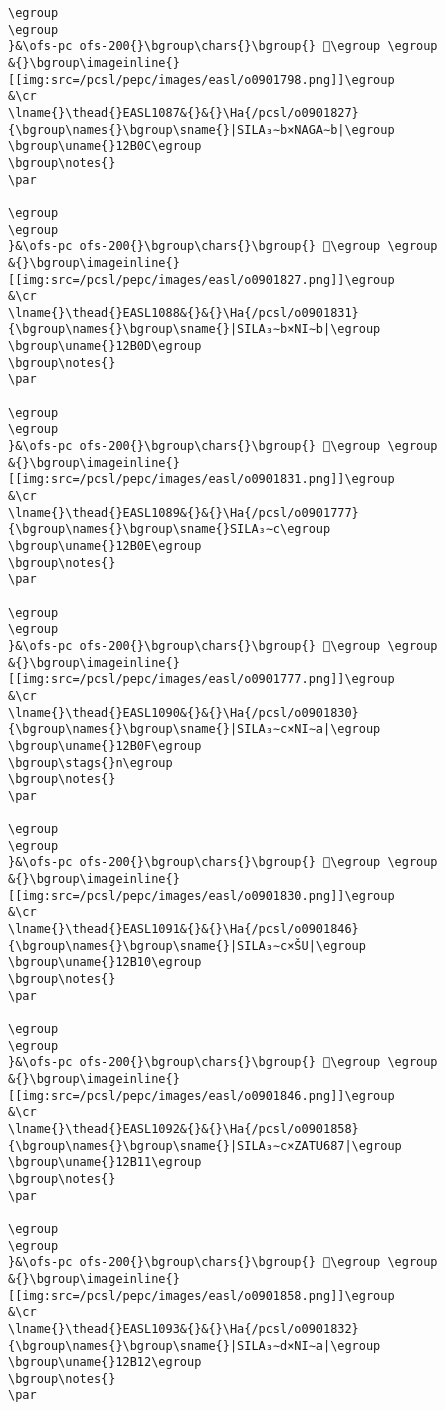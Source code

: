 \begin{verbatim}
\egroup
\egroup
}&\ofs-pc ofs-200{}\bgroup\chars{}\bgroup{} 𒬋\egroup \egroup
&{}\bgroup\imageinline{}[[img:src=/pcsl/pepc/images/easl/o0901798.png]]\egroup
&\cr
\lname{}\thead{}EASL1087&{}&{}\Ha{/pcsl/o0901827}{\bgroup\names{}\bgroup\sname{}|SILA₃∼b×NAGA∼b|\egroup
\bgroup\uname{}12B0C\egroup
\bgroup\notes{}
\par 

\egroup
\egroup
}&\ofs-pc ofs-200{}\bgroup\chars{}\bgroup{} 𒬌\egroup \egroup
&{}\bgroup\imageinline{}[[img:src=/pcsl/pepc/images/easl/o0901827.png]]\egroup
&\cr
\lname{}\thead{}EASL1088&{}&{}\Ha{/pcsl/o0901831}{\bgroup\names{}\bgroup\sname{}|SILA₃∼b×NI∼b|\egroup
\bgroup\uname{}12B0D\egroup
\bgroup\notes{}
\par 

\egroup
\egroup
}&\ofs-pc ofs-200{}\bgroup\chars{}\bgroup{} 𒬍\egroup \egroup
&{}\bgroup\imageinline{}[[img:src=/pcsl/pepc/images/easl/o0901831.png]]\egroup
&\cr
\lname{}\thead{}EASL1089&{}&{}\Ha{/pcsl/o0901777}{\bgroup\names{}\bgroup\sname{}SILA₃∼c\egroup
\bgroup\uname{}12B0E\egroup
\bgroup\notes{}
\par 

\egroup
\egroup
}&\ofs-pc ofs-200{}\bgroup\chars{}\bgroup{} 𒬎\egroup \egroup
&{}\bgroup\imageinline{}[[img:src=/pcsl/pepc/images/easl/o0901777.png]]\egroup
&\cr
\lname{}\thead{}EASL1090&{}&{}\Ha{/pcsl/o0901830}{\bgroup\names{}\bgroup\sname{}|SILA₃∼c×NI∼a|\egroup
\bgroup\uname{}12B0F\egroup
\bgroup\stags{}n\egroup
\bgroup\notes{}
\par 

\egroup
\egroup
}&\ofs-pc ofs-200{}\bgroup\chars{}\bgroup{} 𒬏\egroup \egroup
&{}\bgroup\imageinline{}[[img:src=/pcsl/pepc/images/easl/o0901830.png]]\egroup
&\cr
\lname{}\thead{}EASL1091&{}&{}\Ha{/pcsl/o0901846}{\bgroup\names{}\bgroup\sname{}|SILA₃∼c×ŠU|\egroup
\bgroup\uname{}12B10\egroup
\bgroup\notes{}
\par 

\egroup
\egroup
}&\ofs-pc ofs-200{}\bgroup\chars{}\bgroup{} 𒬐\egroup \egroup
&{}\bgroup\imageinline{}[[img:src=/pcsl/pepc/images/easl/o0901846.png]]\egroup
&\cr
\lname{}\thead{}EASL1092&{}&{}\Ha{/pcsl/o0901858}{\bgroup\names{}\bgroup\sname{}|SILA₃∼c×ZATU687|\egroup
\bgroup\uname{}12B11\egroup
\bgroup\notes{}
\par 

\egroup
\egroup
}&\ofs-pc ofs-200{}\bgroup\chars{}\bgroup{} 𒬑\egroup \egroup
&{}\bgroup\imageinline{}[[img:src=/pcsl/pepc/images/easl/o0901858.png]]\egroup
&\cr
\lname{}\thead{}EASL1093&{}&{}\Ha{/pcsl/o0901832}{\bgroup\names{}\bgroup\sname{}|SILA₃∼d×NI∼a|\egroup
\bgroup\uname{}12B12\egroup
\bgroup\notes{}
\par 


\end{verbatim}
